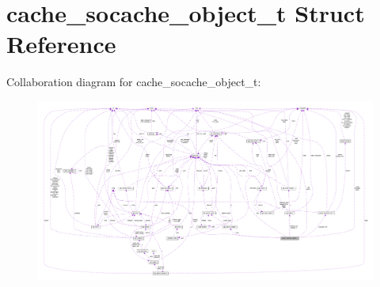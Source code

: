 \hypertarget{structcache__socache__object__t}{}\section{cache\+\_\+socache\+\_\+object\+\_\+t Struct Reference}
\label{structcache__socache__object__t}


Collaboration diagram for cache\+\_\+socache\+\_\+object\+\_\+t\+:
\nopagebreak
\begin{figure}[H]
\begin{center}
\leavevmode
\includegraphics[width=350pt]{structcache__socache__object__t__coll__graph}
\end{center}
\end{figure}
